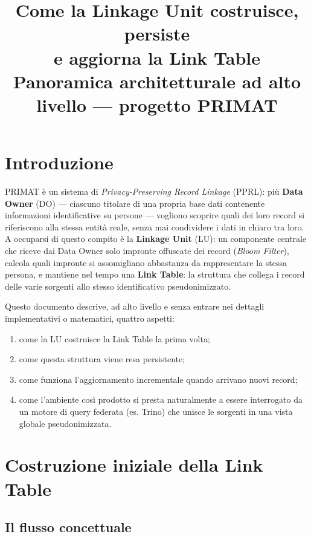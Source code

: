 \documentclass[11pt,a4paper]{article}
\title{\textbf{Come la Linkage Unit costruisce, persiste \\ e aggiorna la Link Table}\\[4pt]
\large Panoramica architetturale ad alto livello --- progetto PRIMAT}
\author{}
\date{}
\begin{document}
\maketitle
\vspace{-1.2cm}

\section{Introduzione}

PRIMAT \`e un sistema di \emph{Privacy-Preserving Record Linkage} (PPRL): pi\`u
\textbf{Data Owner} (DO) --- ciascuno titolare di una propria base dati contenente
informazioni identificative su persone --- vogliono scoprire quali dei loro record
si riferiscono alla stessa entit\`a reale, senza mai condividere i dati in chiaro
tra loro. A occuparsi di questo compito \`e la \textbf{Linkage Unit} (LU): un
componente centrale che riceve dai Data Owner solo impronte offuscate dei record
(\emph{Bloom Filter}), calcola quali impronte si assomigliano abbastanza da
rappresentare la stessa persona, e mantiene nel tempo una \textbf{Link Table}:
la struttura che collega i record delle varie sorgenti allo stesso identificativo
pseudonimizzato.

Questo documento descrive, ad alto livello e senza entrare nei dettagli
implementativi o matematici, quattro aspetti:
\begin{enumerate}[nosep]
    \item come la LU costruisce la Link Table la prima volta;
    \item come questa struttura viene resa persistente;
    \item come funziona l'aggiornamento incrementale quando arrivano nuovi record;
    \item come l'ambiente cos\`i prodotto si presta naturalmente a essere interrogato
        da un motore di query federata (es. Trino) che unisce le sorgenti in una
        vista globale pseudonimizzata.
\end{enumerate}

\section{Costruzione iniziale della Link Table}

\subsection{Il flusso concettuale}
\end{document}
